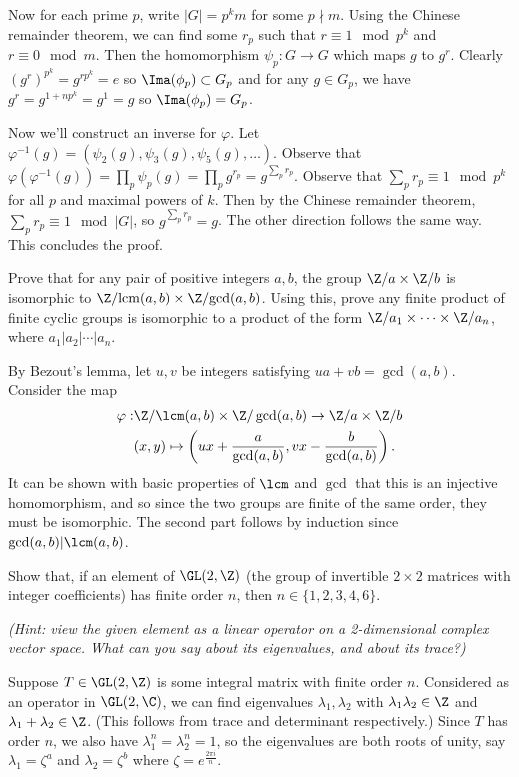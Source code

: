 \documentclass[11pt,letterpaper]{article}
\begin{document}
Now for each prime $p$, write $|G|=p^km$ for some $p\nmid m$. Using the Chinese remainder theorem, we can find some $r_p$ such that $r\equiv 1\mod p^k$ and $r\equiv 0\mod m$. Then the homomorphism $\psi_p : G \to G$ which maps $g$ to $g^r$. Clearly $(g^r)^{p^k}=g^{rp^k}=e$ so $\Ima(\phi_p)\subset G_p$ and for any $g\in G_p$, we have $g^r=g^{1+np^k}=g^1=g$ so $\Ima(\phi_p)=G_p$.

Now we'll construct an inverse for $\varphi$. Let $\varphi^{-1}(g)=(\psi_2(g), \psi_3(g), \psi_5(g),\ldots)$. Observe that $\varphi(\varphi^{-1}(g))=\prod_p \psi_p(g)=\prod_p g^{r_p}=g^{\sum_p r_p}$. Observe that $\sum_p r_p\equiv 1\mod p^k$ for all $p$ and maximal powers of $k$. Then by the Chinese remainder theorem, $\sum_p r_p\equiv 1\mod |G|$, so $g^{\sum_p r_p}=g$. The other direction follows the same way. This concludes the proof.

\pagebreak
\begin{problem}
  Prove that for any pair of positive integers $a,b$, the group $\Z/a \times \Z/b$ is isomorphic to $\Z/\mathrm{lcm}(a,b) \times \Z/\mathrm{gcd}(a,b)$. Using this, prove any finite product of finite cyclic groups is isomorphic to a product of the form $\Z/a_1 \times \cdots \times \Z/a_n$, where $a_1|a_2| \cdots | a_n$.
\end{problem}

By Bezout's lemma, let $u,v$ be integers satisfying $ua+vb=\gcd(a,b)$.
Consider the map
\[
  \begin{aligned}
    \varphi :& \Z/\lcm(a,b)\times \Z/\gcd(a,b) \to \Z/a\times\Z/b\\
    & (x,y) \mapsto \left(ux+\frac{a}{\gcd(a,b)}, vx-\frac{b}{\gcd(a,b)}\right).
    \end{aligned}
\]   
It can be shown with basic properties of $\lcm$ and $\gcd$ that this is an injective homomorphism, and so since the two groups are finite of the same order, they must be isomorphic. The second part follows by induction since $\gcd(a,b) | \lcm(a,b)$.   


\pagebreak
\begin{problem}
Show that, if an element of $\GL(2,\Z)$ (the group of invertible $2\times 2$ matrices with integer coefficients) has finite order $n$, then $n\in\{1,2,3,4,6\}$.
\end{problem}
\textit{(Hint: view the given element as a linear operator on a 2-dimensional complex vector space.
What can you say about its eigenvalues, and about its trace?)}

Suppose $T\in\GL(2,\Z)$ is some integral matrix with finite order $n$. Considered as an operator in $\GL(2,\C)$, we can find eigenvalues $\lambda_1, \lambda_2$ with $\lambda_1\lambda_2\in \Z$ and  $\lambda_1+\lambda_2\in \Z$. (This follows from trace and determinant respectively.) Since $T$ has order $n$, we also have $\lambda_1^n = \lambda_2^n = 1$, so the eigenvalues are both roots of unity, say $\lambda_1=\zeta^a$ and $\lambda_2=\zeta^b$ where $\zeta = e^{\frac{2\pi i}{n}}$.
\end{document}
